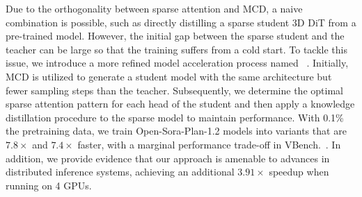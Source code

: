 



Due to the orthogonality between sparse attention and MCD, a naive combination is possible, such as directly distilling a sparse student 3D DiT from a pre-trained model. 
However, %
the initial gap between the sparse student and the teacher can be large so that the training suffers from a cold start. 
To tackle this issue, 
we introduce a more refined model acceleration process named ~\methodname. Initially, MCD is utilized to generate a student model with the same architecture but fewer sampling steps than the teacher. Subsequently, we determine the optimal sparse attention pattern for each head of the student and then apply a knowledge distillation procedure to the sparse model to maintain performance.
With 0.1\% the pretraining data, we train Open-Sora-Plan-1.2 models into variants that are $7.8\times$ and $7.4\times$ faster, with a marginal performance trade-off in VBench.~\citep{huang2024vbench}.
In addition, we provide evidence that our approach is amenable to advances in distributed inference systems, achieving an additional $3.91\times$ speedup when running on 4 GPUs.

